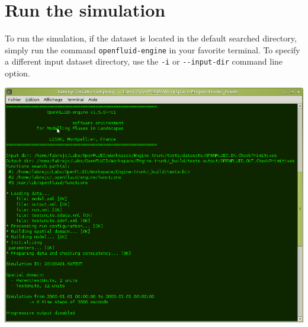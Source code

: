 % 
% 


\section{Run the simulation}

To run the simulation, if the dataset is located in the default searched directory, simply run the command \texttt{openfluid-engine} in your favorite terminal. 
To specify a different input dataset directory, use the \texttt{-i} or \verb?--?\texttt{input-dir} command line option.    

\bigskip

\begin{latexonly}
\begin{center}
\includegraphics[scale=0.4]{common/graphics/oferun.png}
\end{center}
\end{latexonly}


